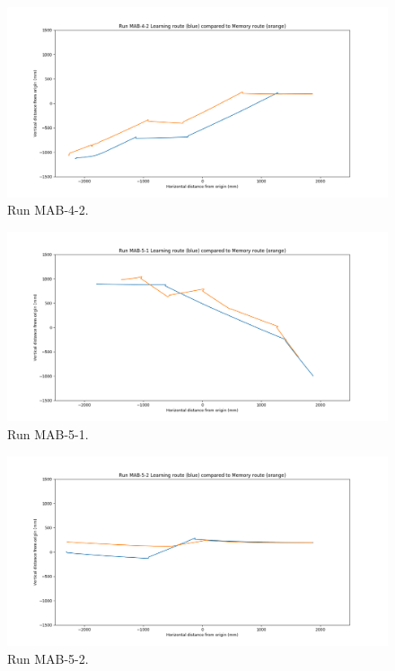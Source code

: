 \documentclass[a4paper,11pt,twoside,openright]{article}
\begin{document}
\begin{figure}[h!]
 \centering
  \includegraphics[width=\textwidth]{MAB-4-2}
  \caption{
    \label{fig:mab-4-2} Run MAB-4-2.
  }
\end{figure}

\begin{figure}[h!]
 \centering
  \includegraphics[width=\textwidth]{MAB-5-1}
  \caption{
    \label{fig:mab-5-1} Run MAB-5-1.
  }
\end{figure}

\begin{figure}[h!]
 \centering
  \includegraphics[width=\textwidth]{MAB-5-2-S}
  \caption{
    \label{fig:mab-5-2} Run MAB-5-2.
  }
\end{figure}
\end{document}
